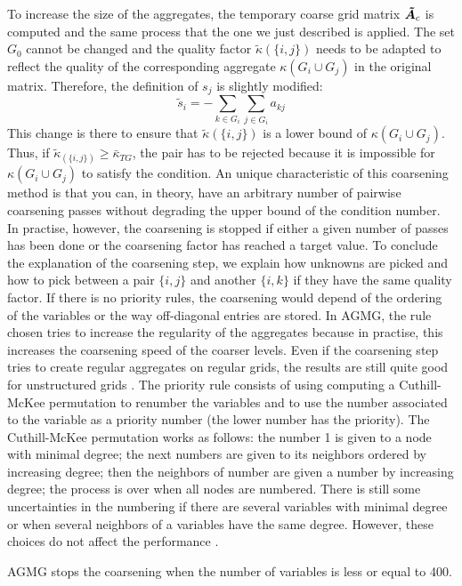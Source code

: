 To increase the size of the aggregates, the temporary coarse grid matrix
$\boldsymbol{\tilde{A}}_c$ is computed and the same process that the one we just
described is applied. The set $G_0$ cannot be changed and the quality factor
$\tilde{\kappa}(\{i,j\})$ needs to be adapted to reflect the quality of the
corresponding aggregate $\kappa(G_i\cup G_j)$ in the original matrix.
Therefore, the definition of $s_j$ is slightly modified:
\begin{equation}
  \tilde{s}_i = - \sum_{k \in G_i} \sum_{j \in G_i} a_{kj}
\end{equation}
This change is there to ensure that $\tilde{\kappa}(\{i,j\})$ is a lower
bound of $\kappa(G_i \cup G_j)$. Thus, if $\tilde{\kappa}_(\{i,j\}) \geq
\bar{\kappa}_{TG}$, the pair has to be rejected because it is impossible for
$\kappa(G_i \cup G_j)$ to satisfy the condition. An unique characteristic 
of this coarsening method is that you can, in theory, have an 
arbitrary number of pairwise coarsening passes without degrading the upper
bound of the condition number. In practise, however, the coarsening is
stopped if either a given number of passes has been done or the coarsening
factor has reached a target value. To conclude the explanation of the
coarsening step, we explain how unknowns are picked and how to pick between 
a pair $\{i,j\}$ and another $\{i,k\}$ if they have the same quality factor. 
If there is no priority rules, the coarsening would depend of the ordering 
of the variables or the way off-diagonal entries are stored. In AGMG, the 
rule chosen tries to increase the regularity of the aggregates because in 
practise, this increases the coarsening speed of the coarser levels. Even 
if the coarsening step tries to create regular aggregates on regular grids, 
the results are still quite good for unstructured grids \cite{agmg2}. The 
priority rule consists of using computing a Cuthill-McKee permutation 
\cite{cmk} to renumber the variables and to use the number associated to the 
variable as a priority number (the lower number has the priority). The 
Cuthill-McKee permutation works as follows: the number 1 is given to a node 
with minimal degree; the next numbers are given to its neighbors ordered by
increasing degree; then the neighbors of number are given a number by
increasing degree; the process is over when all nodes are numbered. There is
still some uncertainties in the numbering if there are several variables
with minimal degree or when several neighbors of a variables have the same
degree. However, these choices do not affect the
performance \cite{agmg2}. 

AGMG stops the coarsening when the number of variables is less or equal to
400.
